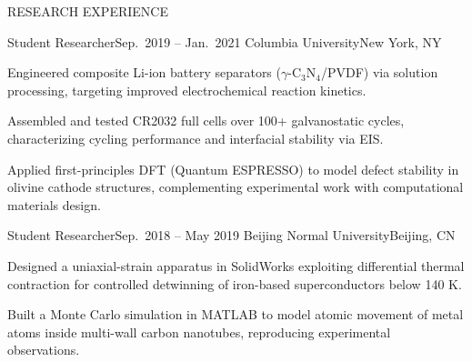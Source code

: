 \documentclass{resume} %
\begin{document}
\begin{rSection}{RESEARCH EXPERIENCE}
\begin{rSubsection}
{Student Researcher}{Sep.\ 2019 -- Jan.\ 2021}
{Columbia University}{New York, NY}
\item Engineered composite Li-ion battery separators ($\gamma$-C$_3$N$_4$/PVDF) via solution processing, targeting improved electrochemical reaction kinetics.
\item Assembled and tested CR2032 full cells over 100+ galvanostatic cycles, characterizing cycling performance and interfacial stability via EIS.
\item Applied first-principles DFT (Quantum ESPRESSO) to model defect stability in olivine cathode structures, complementing experimental work with computational materials design.
\end{rSubsection}

\begin{rSubsection}
{Student Researcher}{Sep.\ 2018 -- May 2019}
{Beijing Normal University}{Beijing, CN}
\item Designed a uniaxial-strain apparatus in SolidWorks exploiting differential thermal contraction for controlled detwinning of iron-based superconductors below 140 K.
\item Built a Monte Carlo simulation in MATLAB to model atomic movement of metal atoms inside multi-wall carbon nanotubes, reproducing experimental observations.
\end{rSubsection}

\end{rSection}

\end{document}
